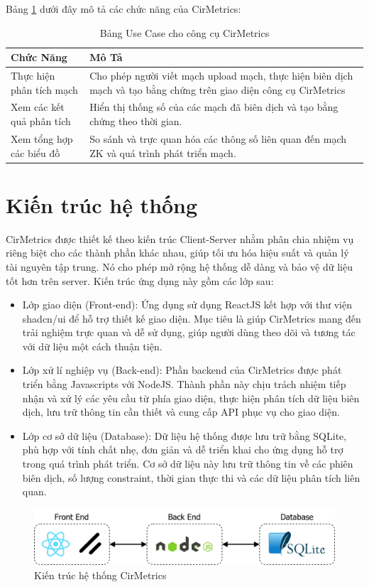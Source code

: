 Bảng \ref{tab:use_case_cirmetrics} dưới đây mô tả các chức năng của CirMetrics:

\begin{table}[h]
    \centering
    \begin{tabular}{|l|p{7cm}|}
        \hline
        \textbf{Chức Năng} & \textbf{Mô Tả} \\ \hline
        Thực hiện phân tích mạch & Cho phép người viết mạch upload mạch, thực hiện biên dịch mạch và tạo bằng chứng trên giao diện công cụ CirMetrics\\ \hline
        Xem các kết quả phân tích & Hiển thị thống số của các mạch đã biên dịch và tạo bằng chứng theo thời gian. \\ \hline
        Xem tổng hợp các biểu đồ & So sánh và trực quan hóa các thông số liên quan đến mạch ZK và quá trình phát triển mạch.
        \\ \hline
    \end{tabular}
    \caption{Bảng Use Case cho công cụ CirMetrics}
    \label{tab:use_case_cirmetrics}
\end{table}
\section{Kiến trúc hệ thống}

CirMetrics được thiết kế theo kiến trúc Client-Server nhằm phân chia nhiệm vụ riêng biệt cho các thành phần khác nhau, giúp tối ưu hóa hiệu suất và quản lý tài nguyên tập trung. Nó cho phép mở rộng hệ thống dễ dàng và bảo vệ dữ liệu tốt hơn trên server. Kiến trúc ứng dụng này gồm các lớp sau:
\begin{itemize}
    \item Lớp giao diện (Front-end): Ứng dụng sử dụng ReactJS kết hợp với thư viện shadcn/ui để hỗ trợ thiết kế giao diện. Mục tiêu là giúp CirMetrics mang đến trải nghiệm trực quan và dễ sử dụng, giúp người dùng theo dõi và tương tác với dữ liệu một cách thuận tiện.
    \item Lớp xử lí nghiệp vụ (Back-end): Phần backend của CirMetrics được phát triển bằng Javascripts với NodeJS. Thành phần này chịu trách nhiệm tiếp nhận và xử lý các yêu cầu từ phía giao diện, thực hiện phân tích dữ liệu biên dịch, lưu trữ thông tin cần thiết và cung cấp API phục vụ cho giao diện.
    \item Lớp cơ sở dữ liệu (Database): Dữ liệu hệ thống được lưu trữ bằng SQLite, phù hợp với tính chất nhẹ, đơn giản và dễ triển khai cho ứng dụng hỗ trợ trong quá trình phát triển. Cơ sở dữ liệu này lưu trữ thông tin về các phiên biên dịch, số lượng constraint, thời gian thực thi và các dữ liệu phân tích liên quan.
\end{itemize}
\begin{figure}[H]
    \centering
    \includegraphics[width=\textwidth]{imgs/ToolsApp.png}
    \caption{Kiến trúc hệ thống CirMetrics}
    \label{fig:chapter6-ToolsApp}
\end{figure}

